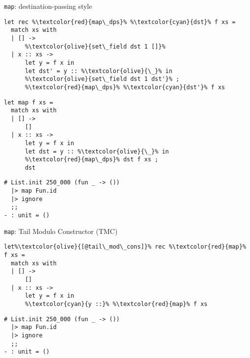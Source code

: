 \begin{frame}[fragile]{\texttt{map}: destination-passing style}
\begin{minipage}{0.5\linewidth}
\begin{lstlisting}
let rec %\textcolor{red}{map\_dps}% %\textcolor{cyan}{dst}% f xs =
  match xs with
  | [] ->
      %\textcolor{olive}{set\_field dst 1 []}%
  | x :: xs ->
      let y = f x in
      let dst' = y :: %\textcolor{olive}{\_}% in
      %\textcolor{olive}{set\_field dst 1 dst'}% ;
      %\textcolor{red}{map\_dps}% %\textcolor{cyan}{dst'}% f xs
\end{lstlisting}
\end{minipage}
\begin{minipage}{0.45\linewidth}
\begin{lstlisting}
let map f xs =
  match xs with
  | [] ->
      []
  | x :: xs ->
      let y = f x in
      let dst = y :: %\textcolor{olive}{\_}% in
      %\textcolor{red}{map\_dps}% dst f xs ;
      dst
\end{lstlisting}
\end{minipage}
\vfill
\begin{lstlisting}
# List.init 250_000 (fun _ -> ())
  |> map Fun.id
  |> ignore
  ;;
- : unit = ()
\end{lstlisting}
\end{frame}

\begin{frame}[fragile]{\texttt{map}: Tail Modulo Constructor (TMC)}
\begin{lstlisting}
let%\textcolor{olive}{[@tail\_mod\_cons]}% rec %\textcolor{red}{map}% f xs =
  match xs with
  | [] ->
      []
  | x :: xs ->
      let y = f x in
      %\textcolor{cyan}{y ::}% %\textcolor{red}{map}% f xs
\end{lstlisting}
\vfill
\begin{lstlisting}
# List.init 250_000 (fun _ -> ())
  |> map Fun.id
  |> ignore
  ;;
- : unit = ()
\end{lstlisting}
\end{frame}

